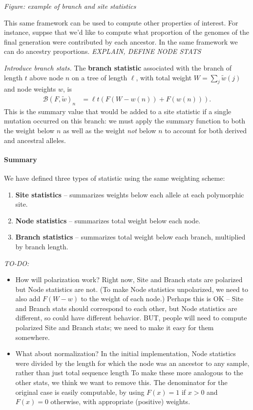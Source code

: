 \documentclass{article}
\newcommand{\branch}{\mathcal{B}} %
\newcommand{\nw}{{w}} %
\newcommand{\iw}{{\tilde w}} %
\newcommand{\Tw}{{W}} %
\newcommand{\plr}[1]{{\color{blue} \it #1}}
\begin{document}
\plr{Figure: example of branch and site statistics}

This same framework can be used to compute other properties of interest.
For instance, suppse that we'd like to compute
what proportion of the genomes of the final generation were contributed by each ancestor.
In the same framework we can do ancestry proportions.
\plr{EXPLAIN, DEFINE NODE STATS}

\plr{Introduce branch stats.}
The \textbf{branch statistic} associated with the branch of length $t$
above node $n$ on a tree of length $\ell$,
with total weight $\Tw = \sum_j \iw(j)$
and node weights $\nw$,
is
\begin{align}
    \branch(F, \iw)_n
    &=
    \ell t ( F(\Tw - \nw(n)) + F(\nw(n)) ) .
\end{align}
This is the summary value that would be added to a site statistic
if a single mutation occurred on this branch:
we must apply the summary function
to both the weight below $n$ as well as the weight \emph{not} below $n$
to account for both derived and ancestral alleles.

\paragraph{Summary}
We have defined three types of statistic using the same weighting scheme:
\begin{enumerate}
    \item \textbf{Site statistics}
        -- summarizes weights below each allele at each polymorphic site.
    \item \textbf{Node statistics}
        -- summarizes total weight below each node.
    \item \textbf{Branch statistics}
        -- summarizes total weight below each branch, multiplied by branch length.
\end{enumerate}


\plr{TO-DO:}
\begin{itemize}

    \item How will polarization work?
        Right now, Site and Branch stats are polarized but Node statistics are not.
        (To make Node statistics unpolarized, we need to also add $F(\Tw - w)$
        to the weight of each node.)
        Perhaps this is OK -- Site and Branch stats should correspond to each other,
        but Node statistics are different, so could have different behavior.
        BUT, people will need to compute polarized Site and Branch stats;
        we need to make it easy for them somewhere.

    \item What about normalization?
        In the initial implementation, Node statistics were divided by the length
        for which the node was an ancestor to any sample, rather than just total sequence length
        To make these more analogous to the other stats, we think we want to remove this.
        The denominator for the original case is easily computable, by using
        $F(x) = 1$ if $x>0$ and $F(x)=0$ otherwise, with appropriate (positive) weights.

\end{itemize}
\end{document}
